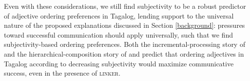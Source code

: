 \documentclass[12pt,letterpaper]{article}
\begin{document}
Even with these considerations, we still find subjectivity to be a robust predictor of adjective ordering preferences in Tagalog, lending support to the universal nature of the proposed explanations discussed in Section \ref{background}: pressures toward successful communication should apply universally, such that we find subjectivity-based ordering preferences. Both the incremental-processing story of \cite{hahnetal2018} and the hierarchical-composition story of \cite{simonic2018} and \cite{scontrasetalSPadjectives} predict that ordering adjectives in Tagalog according to decreasing subjectivity would maximize communicative success, even in the presence of \textsc{linker}.\\[15pt]



\end{document}
